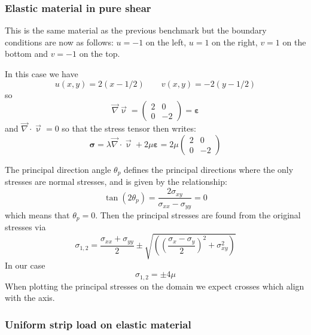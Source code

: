 \subsubsection{Elastic material in pure shear} \label{sec:elastpureshear}

This is the same material as the previous benchmark but the boundary conditions are 
now as follows: $u=-1$ on the left, $u=1$ on the right, $v=1$ on the bottom and $v=-1$
on the top. 

In this case we have 
\[
u(x,y)=2(x-1/2) 
\qquad
v(x,y)=-2(y-1/2) 
\]
so 
\[
\vec{\nabla}\vec{\upnu}=
\left(
\begin{array}{cc}
2 & 0 \\
0 & -2
\end{array}
\right)
={\bm \varepsilon}
\]
and $\vec{\nabla}\cdot \vec{\upnu}=0$ so that 
the stress tensor then writes:
\[
{\bm \sigma}= \lambda \vec{\nabla}\cdot \vec{\upnu} + 2 \mu {\bm \varepsilon} 
= 2\mu 
\left(
\begin{array}{cc}
2 & 0 \\
0 & -2
\end{array}
\right)
\]

The principal direction angle $\theta_p$ defines the principal
directions where the only stresses are normal stresses, and 
is given by the relationship:
\[
\tan (2\theta_p) =  \frac{2 \sigma_{xy}}{\sigma_{xx} -\sigma_{yy}} = 0
\]
which means that $\theta_p = 0$.
Then the principal stresses are found from the original stresses via
\[
\sigma_{1,2}=\frac{\sigma_{xx}+\sigma_{yy}}{2} \pm \sqrt{  \left( \left(\frac{\sigma_x-\sigma_y}{2}\right)^2 +\sigma_{xy}^2  \right)}
\]
In our case 
\[
\sigma_{1,2} = \pm 4 \mu 
\]
When plotting the principal stresses on the domain we expect crosses which align with the axis. 






\subsubsection{Uniform strip load on elastic material} \label{sec:elaststripload}


